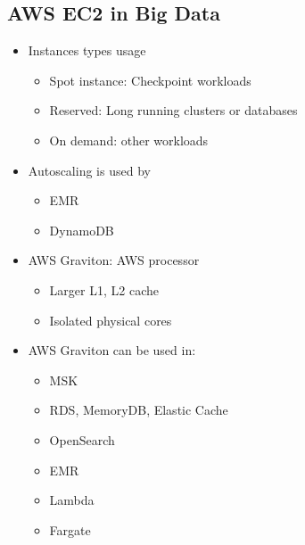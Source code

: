 \documentclass[../../main.tex]{subfiles}
\begin{document}
\subsection{AWS EC2 in Big Data}
\begin{itemize}
    \item Instances types usage
    \begin{itemize}
        \item Spot instance: Checkpoint workloads
        \item Reserved: Long running clusters or databases
        \item On demand: other workloads
    \end{itemize}
    \item Autoscaling is used by
    \begin{itemize}
        \item EMR
        \item DynamoDB
    \end{itemize}
    \item AWS Graviton: AWS processor
    \begin{itemize}
        \item Larger L1, L2 cache
        \item Isolated physical cores
    \end{itemize}
    \item AWS Graviton can be used in:
    \begin{itemize}
        \item MSK
        \item RDS, MemoryDB, Elastic Cache
        \item OpenSearch
        \item EMR
        \item Lambda
        \item Fargate
    \end{itemize}
\end{itemize}
\end{document}
